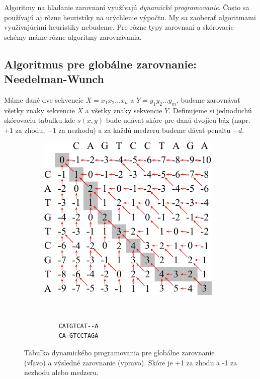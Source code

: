 Algoritmy na hľadanie zarovnaní využívajú \textit{dynamické programovanie}.
Často sa používajú aj rôzne heuristiky na urýchlenie výpočtu.
My sa zaoberať algoritmami využívajúcimi heuristiky nebudeme. Pre rôzne typy zarovnaní a skórovacie schémy máme rôzne algoritmy zarovnávania.
\cite{durbin, skripta}

\subsection{Algoritmus pre globálne zarovnanie: Needelman-Wunch}
\label{subsec:global-alignment}
Máme dané dve sekvencie $X = x_1x_2\dots x_n$ a $Y = y_1y_2\dots y_m$, budeme zarovnávať všetky znaky sekvencie $X$ a všetky znaky sekvencie $Y$.
Definujeme si jednoduchú skórovaciu tabuľku kde $s(x, y)$ bude udávať skóre pre danú dvojicu báz (napr. $+1$ za zhodu, $-1$ za nezhodu) a za každú medzeru budeme dávať penaltu $-d$.


\begin{figure}[htp]
    \centering
    \begin{subfigure}[m]{0.5\textwidth}
    \centering
    \includegraphics[width=\textwidth]{images/global_alignment}
    \end{subfigure}
    ~
    \begin{subfigure}[m]{0.3\textwidth}
    \centering
    \begin{verbatim}
    CATGTCAT--A
    CA-GTCCTAGA
    \end{verbatim}
    \end{subfigure}
    \caption[Tabuľka dyn. programovania pre  globálne zarovnanie]{Tabuľka dynamického programovania pre  globálne zarovnanie (vľavo) a výsledné zarovnanie (vpravo). Skóre je +1 za zhodu a -1 za nezhodu alebo medzeru.}
    \label{fig:global-align}
\end{figure}

